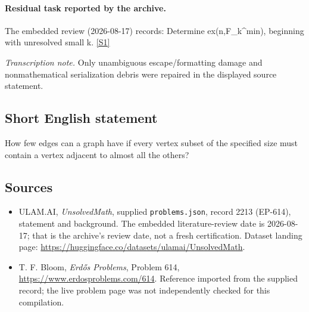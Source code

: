 \documentclass[11pt,a4paper]{article}
\newcommand{\sref}[2]{\hyperlink{source:#1:#2}{[S#2]}}
\begin{document}
\paragraph{Residual task reported by the archive.}

The embedded review (2026-08-17) records: Determine ex(n,F\_k\textasciicircum{}min), beginning with unresolved small k. \sref{2213}{1}

{\small\emph{Transcription note.} Only unambiguous escape/formatting damage and nonmathematical serialization debris were repaired in the displayed source statement.}

\subsection{Short English statement}

How few edges can a graph have if every vertex subset of the specified size must contain a vertex adjacent to almost all the others?

\subsection{Sources}

{\small

\begin{itemize}

\item[\hypertarget{source:2213:1}{S1}] ULAM.AI, \emph{UnsolvedMath}, supplied \texttt{problems.json}, record 2213 (EP-614), statement and background. The embedded literature-review date is 2026-08-17; that is the archive’s review date, not a fresh certification. Dataset landing page: \url{https://huggingface.co/datasets/ulamai/UnsolvedMath}.

\item[\hypertarget{source:2213:2}{S2}] T. F. Bloom, \emph{Erdős Problems}, Problem 614, \url{https://www.erdosproblems.com/614}. Reference imported from the supplied record; the live problem page was not independently checked for this compilation.

\end{itemize}

}

\label{end:2213}
\end{document}
